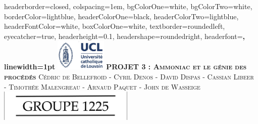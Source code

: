 \documentclass[landscape,a0paper,fontscale=0.285]{baposter} %
\begin{document}
\begin{poster}
{
headerborder=closed, %
colspacing=1em, %
bgColorOne=white, %
bgColorTwo=white, %
borderColor=lightblue, %
headerColorOne=black, %
headerColorTwo=lightblue, %
headerFontColor=white, %
boxColorOne=white, %
textborder=roundedleft, %
eyecatcher=true, %
headerheight=0.1\textheight, %
headershape=roundedright, %
headerfont=\Large\bf\textsc, %
linewidth=1pt %
}
%
{\includegraphics[height=4em]{UCL.jpg}} 
{\bf\textsc{PROJET 3 : Ammoniac et le g\'enie des proc\'ed\'es}\vspace{0.5em}} 
{\textsc{\small Cédric de Bellefroid - Cyril Denos - David Dispas  - Cassian Libeer  - Timothée Malengreau - Arnaud Paquet - John de Wasseige}} 
{\includegraphics[height=4em]{groupe.png}} 




\end{poster}
\end{document}
